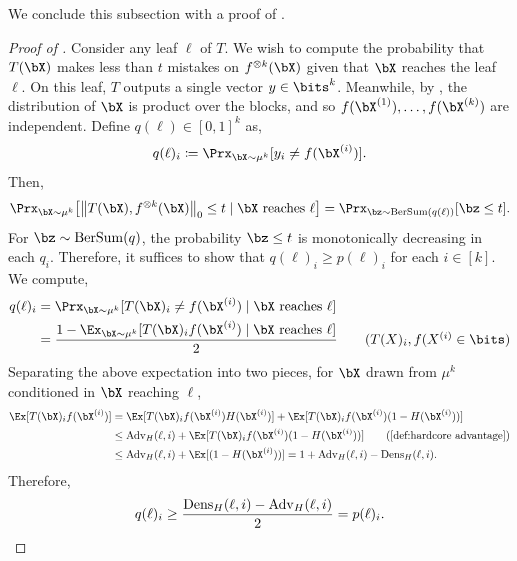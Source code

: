 \documentclass[11pt]{article}
\newcommand{\BerSum}{\mathrm{BerSum}}
\newcommand{\dens}{\mathrm{Dens}}
\newcommand{\adv}{\mathrm{Adv}}
\DeclarePairedDelimiter\lzero{\|}{\|_0}
\DeclarePairedDelimiter\bracket{[}{]}
\begin{document}
We conclude this subsection with a proof of .
\begin{proof}[Proof of ]
    Consider any leaf $\ell$ of $T$. We wish to compute the probability that $T(\bX)$ makes less than $t$ mistakes on $f^{\otimes k}(\bX)$ given that $\bX$ reaches the leaf $\ell$. On this leaf, $T$ outputs a single vector $y \in \bits^k$. Meanwhile, by , the distribution of $\bX$ is product over the blocks, and so $f(\bX^{(1)}), \ldots, f(\bX^{(k)})$ are independent. Define $q(\ell) \in [0,1]^k$ as,
    \begin{equation*}
        q(\ell)_i \coloneqq \Prx_{\bX \sim \mu^k}[y_i \neq f(\bX^{(i)})].
    \end{equation*}
    Then,
    \begin{equation*}
        \Prx_{\bX \sim \mu^k}\bracket[\big]{\lzero[\big]{T(\bX), f^{\otimes k}(\bX)} \leq t \mid \bX\text{ reaches }\ell} = \Prx_{\bz \sim \BerSum(q(\ell))}[\bz \leq t].
    \end{equation*}
    For $\bz \sim \BerSum(q)$, the probability $\bz \leq t$ is monotonically decreasing in each $q_i$. Therefore, it suffices to show that $q(\ell)_i \geq p(\ell)_i$ for each $i \in [k]$. We compute,
    \begin{align*}
        q(\ell)_i &= \Prx_{\bX \sim \mu^k}[T(\bX)_i \neq f(\bX^{(i)}) \mid \bX\text{ reaches }\ell] \\
        &=  \frac{1 - \Ex_{\bX \sim \mu^k}[T(\bX)_i f(\bX^{(i)}) \mid \bX\text{ reaches }\ell]}{2} \tag{$T(X)_i, f(X^{(i)} \in \bits$}
    \end{align*}
    Separating the above expectation into two pieces, for $\bX$ drawn from $\mu^k$ conditioned in $\bX$ reaching $\ell$,
    \begin{align*}
        \Ex[T(\bX)_i f(\bX^{(i)})] &= \Ex[T(\bX)_i f(\bX^{(i)})H(\bX^{(i)})] +  \Ex[T(\bX)_i f(\bX^{(i)})(1-H(\bX^{(i)}))] \\
        &\leq \adv_H(\ell,i) +  \Ex[T(\bX)_i f(\bX^{(i)})(1-H(\bX^{(i)}))] \tag{\Cref{def:hardcore advantage}}\\
        &\leq \adv_H(\ell,i) +  \Ex[(1-H(\bX^{(i)}))] = 1 +\adv_H(\ell,i) - \dens_H(\ell,i).
    \end{align*}
    Therefore,
    \begin{equation*}
        q(\ell)_i \geq \frac{\dens_H(\ell,i)- \adv_H(\ell,i)}{2} = p(\ell)_i. \qedhere
    \end{equation*}
\end{proof}
\end{document}
